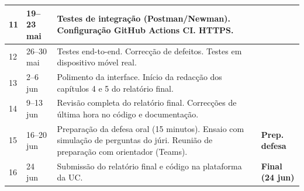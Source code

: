 \documentclass[a4paper,11pt]{article}
\begin{document}
\begin{longtable}{@{}llp{7.5cm}l@{}}
11 & 19--23 mai &
  Testes de integração (Postman/Newman).
  Configuração GitHub Actions CI. HTTPS. &  \\
\midrule

12 & 26--30 mai &
  Testes end-to-end. Correcção de defeitos.
  Testes em dispositivo móvel real. &  \\
\midrule

13 & 2--6 jun &
  Polimento da interface. Início da redacção dos capítulos 4 e 5
  do relatório final. &  \\
\midrule

14 & 9--13 jun &
  Revisão completa do relatório final.
  Correcções de última hora no código e documentação. &  \\
\midrule

15 & 16--20 jun &
  Preparação da defesa oral (15 minutos). Ensaio com simulação de perguntas
  do júri. Reunião de preparação com orientador (Teams). &
  \textbf{Prep. defesa} \\
\midrule

16 & 24 jun &
  Submissão do relatório final e código na plataforma da UC. &
  \textbf{Final (24 jun)} \\

\bottomrule
\end{longtable}

\newpage

\end{document}

